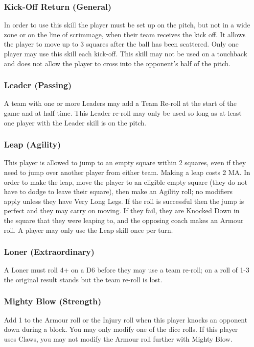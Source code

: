 \begin{multicols}{3}
\subsubsection{Kick-Off Return (General)}
\par In order to use this skill the player must be set up on the pitch, but not in a wide zone or on the line of scrimmage, when their team receives the kick off. It allows the player to move up to 3 squares after the ball has been scattered. Only one player may use this skill each kick-off. This skill may not be used on a touchback and does not allow the player to cross into the opponent's half of the pitch.

\subsubsection{Leader (Passing)}
\par A team with one or more Leaders may add a Team Re-roll at the start of the game and at half time. This Leader re-roll may only be used so long as at least one player with the Leader skill is on the pitch.

\subsubsection{Leap (Agility)}
\par This player is allowed to jump to an empty square within 2 squares, even if they need to jump over another player from either team. Making a leap costs 2 MA. In order to make the leap, move the player to an eligible empty square (they do not have to dodge to leave their square), then make an Agility roll; no modifiers apply unless they have Very Long Legs. If the roll is successful then the jump is perfect and they may carry on moving. If they fail, they are Knocked Down in the square that they were leaping to, and the opposing coach makes an Armour roll. A player may only use the Leap skill once per turn.

\subsubsection{Loner (Extraordinary)}
\par A Loner must roll 4+ on a D6 before they may use a team re-roll; on a roll of 1-3 the original result stands but the team re-roll is lost.

\subsubsection{Mighty Blow (Strength)}
\par Add 1 to the Armour roll or the Injury roll when this player knocks an opponent down during a block. You may only modify one of the dice rolls. If this player uses Claws, you may not modify the Armour roll further with Mighty Blow.


\end{multicols}
